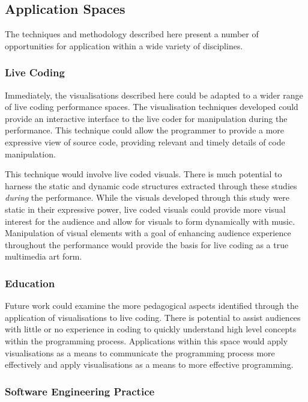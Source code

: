 \subsection{Application Spaces}

The techniques and methodology described here present a number of opportunities for application within a wide variety of disciplines.

\subsubsection{Live Coding}

Immediately, the visualisations described here could be adapted to a wider range of live coding performance spaces. The visualisation techniques developed could provide an interactive interface to the live coder for manipulation during the performance. This technique could allow the programmer to provide a more expressive view of source code, providing relevant and timely details of code manipulation.

This technique would involve live coded visuals. There is much potential to harness the static and dynamic code structures extracted through these studies \emph{during} the performance. While the visuals developed through this study were static in their expressive power, live coded visuals could provide more visual interest for the audience and allow for visuals to form dynamically with music. Manipulation of visual elements with a goal of enhancing audience experience throughout the performance would provide the basis for live coding as a true multimedia art form.

\subsubsection{Education}

Future work could examine the more pedagogical aspects identified through the application of visualisations to live coding. There is potential to assist audiences with little or no experience in coding to quickly understand high level concepts within the programming process. Applications within this space would apply visualisations as a means to communicate the programming process more effectively and apply visualisations as a means to more effective programming.

\subsubsection{Software Engineering Practice}

